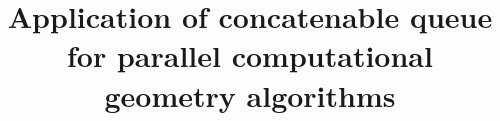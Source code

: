 \documentclass[sigconf]{acmart}
\begin{document}
\title{Application of concatenable queue for parallel computational geometry algorithms}










\end{document}
